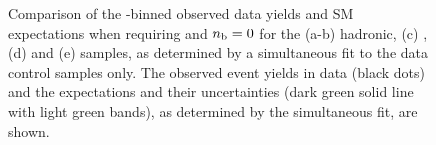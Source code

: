 \begin{figure}[t!]
\begin{center}
{    } 
    \caption{\label{fig:best-fit-control-only-le3j0b} Comparison of the
      \scalht-binned observed data yields and SM expectations
      when requiring \njetlow and $n_{\text{b}} = 0$ for the (a-b) hadronic,
      (c) \mj, (d) \mmj and (e) \gj samples, as determined by a
      simultaneous fit to the data control samples only. The observed
      event yields in data (black dots) and the expectations and their
      uncertainties (dark green solid line with light green bands), as
      determined by the simultaneous fit, are shown. }
  \end{center}
\end{figure}

